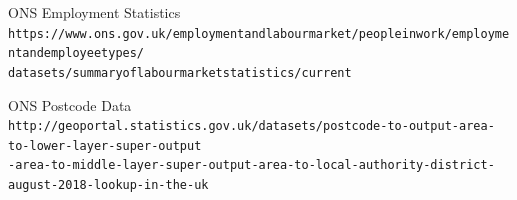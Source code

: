 \documentclass[a4paper,10pt]{article}
\begin{document}
\begin{thebibliography}{9}
      
      ONS Employment Statistics
      \\\texttt{https://www.ons.gov.uk/employmentandlabourmarket/peopleinwork/employmentandemployeetypes/\\datasets/summaryoflabourmarketstatistics/current}

      ONS Postcode Data
      \\\texttt{http://geoportal.statistics.gov.uk/datasets/postcode-to-output-area-to-lower-layer-super-output\\-area-to-middle-layer-super-output-area-to-local-authority-district-august-2018-lookup-in-the-uk}

   \end{thebibliography}
\end{document}
